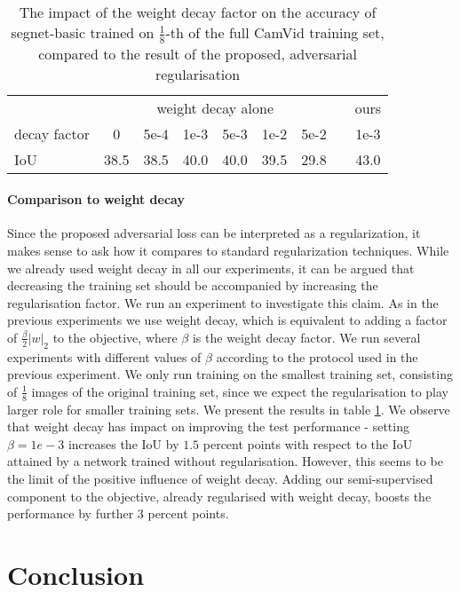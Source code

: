 \documentclass[a4paper]{article}
\begin{document}
\begin{table}
\centering
\caption{The impact of the weight decay factor on the accuracy of segnet-basic trained on $\frac{1}{8}$-th of the full CamVid training set, compared to the result of the proposed, adversarial regularisation\label{resultsRegularisation}}
\setlength{\tabcolsep}{3pt}
\centering
\begin{tabular}{l cccccc c c}
\rule{0pt}{6ex}
             & \multicolumn{6}{c}{weight decay alone}     & & ours \\
decay factor & 0    & 5e-4 & 1e-3 & 5e-3 & 1e-2 & 5e-2 & & 1e-3\\
IoU          & 38.5 & 38.5 & 40.0 & 40.0 & 39.5 & 29.8 & & 43.0
\end{tabular}
\end{table}\paragraph{Comparison to weight decay} Since the proposed adversarial loss can be interpreted as a regularization, it makes sense to ask how it compares to standard regularization techniques. While we already used weight decay in all our experiments, it can be argued that decreasing the training set should be accompanied by increasing the regularisation factor. We run an experiment to investigate this claim. As in the previous experiments we use weight decay, which is equivalent to adding a factor of $\frac{\beta}{2}|w|_2$ to the objective, where $\beta$ is the weight decay factor. We run several experiments with different values of $\beta$ according to the protocol used in the previous experiment. We only run training on the smallest training set, consisting of $\frac{1}{8}$ images of the original training set, since we expect the regularisation to play larger role for smaller training sets. We present the results in table \ref{resultsRegularisation}. We observe that weight decay has impact on improving the test performance - setting $\beta=1e-3$ increases the IoU by $1.5$ percent points with respect to the IoU attained by a network trained without regularisation. However, this seems to be the limit of the positive influence of weight decay. Adding our semi-supervised component to the objective, already regularised with weight decay, boosts the performance by further $3$ percent points.


\section{Conclusion}\label{sec:conclusion}
\end{document}
